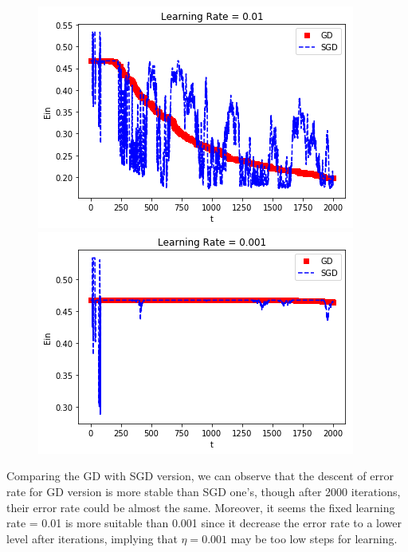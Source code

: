 \documentclass[a4paper,12pt]{article}
\begin{document}
\section{}
\begin{figure}[ht]
\begin{minipage}[b]{0.5\linewidth}
\centering
\includegraphics[scale=0.63]{Q81.png}
\end{minipage}
\hspace{0.5cm}
\begin{minipage}[b]{0.5\linewidth}
\centering
\includegraphics[scale=0.63]{Q82.png}
\end{minipage}
\end{figure}
Comparing the GD with SGD version, we can observe that the descent of error rate for GD version is more stable than SGD one's, though after 2000 iterations, their error rate could be almost the same. Moreover, it seems the fixed learning rate = 0.01 is more suitable than 0.001 since it decrease the error rate to a lower level after iterations, implying that $\eta=0.001$ may be too low steps for learning.
\end{document}
